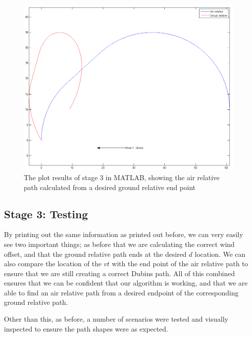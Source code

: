 \begin{figure}[htbp!] 
\centering    
\includegraphics[width=\textwidth]{PP3_Demo}
\caption[stage 3: Generating an Air Relative Path Based on Desired Ground Relative Destination in MATLAB]{The plot results of stage 3 in MATLAB, showing the air relative path calculated from a desired ground relative end point}
\label{fig:pp3demo}
\end{figure}


\subsection{Stage 3: Testing}
\label{task1:stage3:testing}

By printing out the same information as printed out before, we can very easily see two important things; as before that we are calculating the correct wind offset, and that the ground relative path ends at the desired $d$ location. We can also compare the location of the $vt$ with the end point of the air relative path to ensure that we are still creating a correct Dubins path. All of this combined ensures that we can be confident that our algorithm is working, and that we are able to find an air relative path from a desired endpoint of the corresponding ground relative path. 

Other than this, as before, a number of scenarios were tested and visually inspected to ensure the path shapes were as expected.


